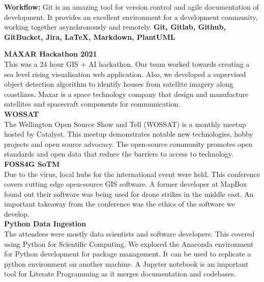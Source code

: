 \documentclass[9pt]{developercv}
\begin{document}
\textbf{Workflow:} Git is an amazing tool for version control and agile documentation of development. It provides an excellent environment for a development community, working together asynchronously and remotely. \textbf{Git, Gitlab, Github, GitBucket, Jira, LaTeX, Markdown, PlantUML} \\

\newpage
{}

\textbf{MAXAR Hackathon 2021} \\
This was a 24 hour GIS + AI hackathon. Our team worked towards creating a sea level rising visualisation web application. Also, we developed a supervised object detection algorithm to identify houses from satellite imagery along coastlines. Maxar is a space technology company that design and manufacture satellites and spacecraft components for communication. \\

\textbf{WOSSAT} \\ 
The Wellington Open Source Show and Tell (WOSSAT) is a monthly meetup hosted by Catalyst. This meetup demonstrates notable new technologies, hobby projects and open source advocacy. The open-source community promotes open standards and open data that reduce the barriers to access to technology. \\

\textbf{FOSS4G SoTM} \\
Due to the virus, local hubs for the international event were held. This conference covers cutting edge open-source GIS software. A former developer at MapBox found out their software was being used for drone strikes in the middle east. An important takeaway from the conference was the ethics of the software we develop. \\

\textbf{Python Data Ingestion} \\
The attendees were mostly data scientists and software developers. This covered using Python for Scientific Computing. We explored the Anaconda environment for Python development for package management. It can be used to replicate a python environment on another machine. A Jupyter notebook is an important tool for Literate Programming as it merges documentation and codebases. \\
\end{document}

